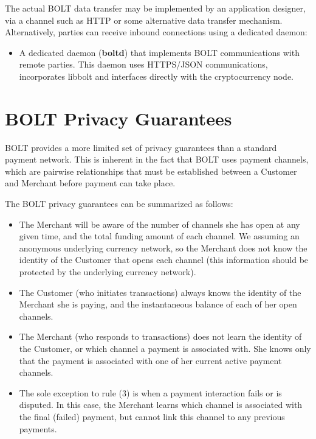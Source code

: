 \documentclass[11pt]{report}
\begin{document}
The actual BOLT data transfer may be implemented by an application designer, via a channel such as HTTP or some alternative data transfer mechanism. Alternatively, parties can receive inbound connections using a dedicated daemon:

\begin{itemize}
\item A dedicated daemon ({\bf boltd}) that implements BOLT communications with remote parties. This daemon uses HTTPS/JSON communications, incorporates libbolt and interfaces directly with the cryptocurrency node.
\end{itemize}

\section{BOLT Privacy Guarantees}
\label{sec:privacy}

BOLT provides a more limited set of privacy guarantees than a standard payment network. This is inherent in the fact that BOLT uses payment channels, which are pairwise relationships that must be established between a Customer and Merchant before payment can take place.

The BOLT privacy guarantees can be summarized as follows:
\begin{itemize}
\item The Merchant will be aware of the number of channels she has open at any given time, and the total funding amount of each channel. We assuming an anonymous underlying currency network, so the Merchant does not know the identity of the Customer that opens each channel (this information should be protected by the underlying currency network).
\item The Customer (who initiates transactions) always knows the identity of the Merchant she is paying, and the instantaneous balance of each of her open channels.
\item The Merchant (who responds to transactions) does not learn the identity of the Customer, or which channel a payment is associated with. She knows only that the payment is associated with one of her current active payment channels.
\item The sole exception to rule (3) is when a payment interaction fails or is disputed. In this case, the Merchant learns which channel is associated with the final (failed) payment, but cannot link this channel to any previous payments. 
\end{itemize}
\end{document}
